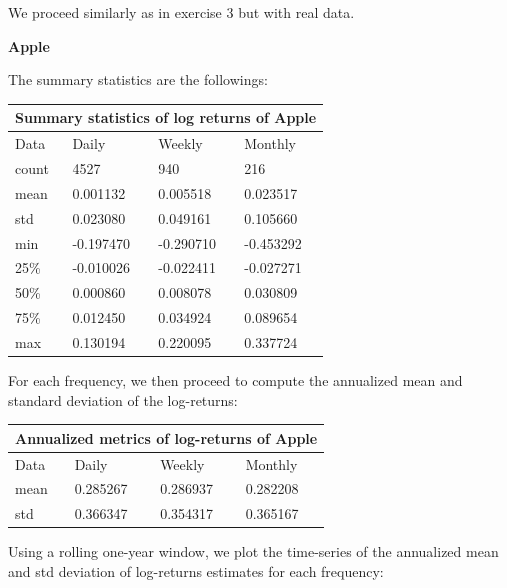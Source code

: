 \documentclass[10pt]{article}
\newenvironment{exercise}[2][Exercise]{\begin{trivlist}
  \item[\hskip \labelsep {\bfseries #1}\hskip \labelsep {\bfseries #2.}]}{\end{trivlist}}
\begin{document}
  \begin{exercise}{4}
  
	We proceed similarly as in exercise 3 but with real data.
	
	\bigbreak	
		
	\textbf{Apple}
	
	\smallbreak
	
	The summary statistics are the followings:
	
	\bigbreak	
	
	\begin{tabular}{ |p{3cm}||p{3cm}|p{3cm}|p{3cm}|  }
 		\hline
		\multicolumn{4}{|c|}{Summary statistics of log returns of Apple} \\
		\hline
		Data & Daily & Weekly & Monthly\\
 		\hline
 		count   &  4527 & 940 & 216\\
 		mean & 0.001132 & 0.005518 & 0.023517\\
 		std & 0.023080 & 0.049161 & 0.105660\\
 		min & -0.197470 & -0.290710 & -0.453292\\
 		25\% & -0.010026 & -0.022411 & -0.027271\\
 		50\% & 0.000860 & 0.008078 & 0.030809\\
 		75\% & 0.012450 & 0.034924 & 0.089654\\
 		max & 0.130194 & 0.220095 & 0.337724\\
 		\hline
	\end{tabular}
	
	\bigbreak	
	
	For each frequency, we then proceed to compute the annualized mean and standard deviation of the log-returns:
	
	\bigbreak
	
	\begin{tabular}{ |p{3cm}||p{3cm}|p{3cm}|p{3cm}|  }
		\hline
	 	\multicolumn{4}{|c|}{Annualized metrics of log-returns of Apple} \\
	 	\hline
	 	Data & Daily & Weekly & Monthly\\
 		\hline
 		mean  &  0.285267 & 0.286937 & 0.282208\\
 		std & 0.366347 & 0.354317 & 0.365167\\
 		\hline
	\end{tabular}
	
	\bigbreak	
	
	Using a rolling one-year window, we plot the time-series of the annualized mean and std deviation of log-returns estimates for each frequency:
	

\end{exercise}
\end{document}
